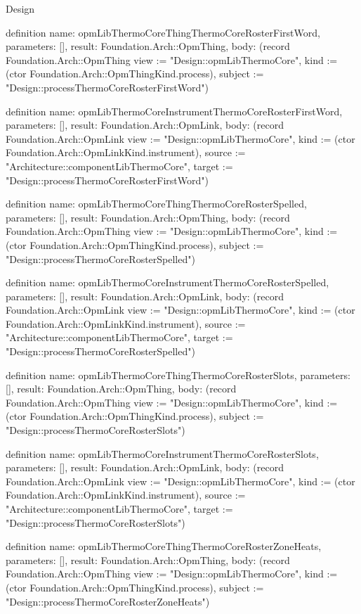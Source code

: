 \begin{lexlean}{Design}
\begin{semanticmodule}
definition{
  name: opmLibThermoCoreThingThermoCoreRosterFirstWord,
  parameters: [],
  result: Foundation.Arch::OpmThing,
  body: (record Foundation.Arch::OpmThing {view := "Design::opmLibThermoCore", kind := (ctor Foundation.Arch::OpmThingKind.process), subject := "Design::processThermoCoreRosterFirstWord"})
}

definition{
  name: opmLibThermoCoreInstrumentThermoCoreRosterFirstWord,
  parameters: [],
  result: Foundation.Arch::OpmLink,
  body: (record Foundation.Arch::OpmLink {view := "Design::opmLibThermoCore", kind := (ctor Foundation.Arch::OpmLinkKind.instrument), source := "Architecture::componentLibThermoCore", target := "Design::processThermoCoreRosterFirstWord"})
}

definition{
  name: opmLibThermoCoreThingThermoCoreRosterSpelled,
  parameters: [],
  result: Foundation.Arch::OpmThing,
  body: (record Foundation.Arch::OpmThing {view := "Design::opmLibThermoCore", kind := (ctor Foundation.Arch::OpmThingKind.process), subject := "Design::processThermoCoreRosterSpelled"})
}

definition{
  name: opmLibThermoCoreInstrumentThermoCoreRosterSpelled,
  parameters: [],
  result: Foundation.Arch::OpmLink,
  body: (record Foundation.Arch::OpmLink {view := "Design::opmLibThermoCore", kind := (ctor Foundation.Arch::OpmLinkKind.instrument), source := "Architecture::componentLibThermoCore", target := "Design::processThermoCoreRosterSpelled"})
}

definition{
  name: opmLibThermoCoreThingThermoCoreRosterSlots,
  parameters: [],
  result: Foundation.Arch::OpmThing,
  body: (record Foundation.Arch::OpmThing {view := "Design::opmLibThermoCore", kind := (ctor Foundation.Arch::OpmThingKind.process), subject := "Design::processThermoCoreRosterSlots"})
}

definition{
  name: opmLibThermoCoreInstrumentThermoCoreRosterSlots,
  parameters: [],
  result: Foundation.Arch::OpmLink,
  body: (record Foundation.Arch::OpmLink {view := "Design::opmLibThermoCore", kind := (ctor Foundation.Arch::OpmLinkKind.instrument), source := "Architecture::componentLibThermoCore", target := "Design::processThermoCoreRosterSlots"})
}

definition{
  name: opmLibThermoCoreThingThermoCoreRosterZoneHeats,
  parameters: [],
  result: Foundation.Arch::OpmThing,
  body: (record Foundation.Arch::OpmThing {view := "Design::opmLibThermoCore", kind := (ctor Foundation.Arch::OpmThingKind.process), subject := "Design::processThermoCoreRosterZoneHeats"})
}


\end{semanticmodule}
\end{lexlean}
